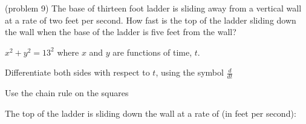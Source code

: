 \documentclass{ximera}
\begin{document}
\begin{problem}(problem 9)
The base of thirteen foot ladder is sliding away from a vertical wall at a rate of two 
feet per second.  How fast is the top of the ladder sliding down the wall when the base of the 
ladder is five feet from the wall?
\begin{hint}
$x^2 + y^2 = 13^2$ where  $x$ and $y$ are functions of time, $t$.
\end{hint}

\begin{hint}
Differentiate both sides with respect to $t$, using the symbol $\frac{d}{dt}$
\end{hint}
\begin{hint}
Use the chain rule on the squares
\end{hint}

The top of the ladder is sliding down the wall at a rate of (in feet per second):
\begin{multipleChoice}
\end{multipleChoice}
\end{problem}
\end{document}
